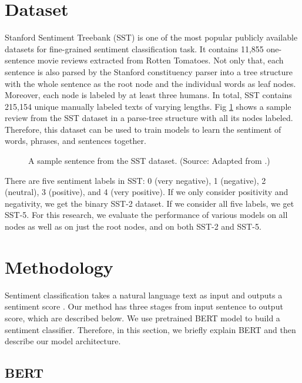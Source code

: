 \documentclass[conference]{IEEEtran}
\begin{document}
 \section{Dataset}\label{sec:data}

Stanford Sentiment Treebank (SST)\cite{rntn} is one of the most popular publicly available datasets for fine-grained sentiment classification task. It contains 11,855 one-sentence movie reviews extracted from Rotten Tomatoes. Not only that, each sentence is also parsed by the Stanford constituency parser\cite{stanford-parser} into a tree structure with the whole sentence as the root node and the individual words as leaf nodes. Moreover, each node is labeled by at least three humans. In total, SST contains 215,154 unique manually labeled texts of varying lengths. Fig \ref{fig:sst-sample} shows a sample review from the SST dataset in a parse-tree structure with all its nodes labeled. Therefore, this dataset can be used to train models to learn the sentiment of words, phrases, and sentences together.

\begin{figure}[ht]
    \centering
    \caption{A sample sentence from the SST dataset. (Source: Adapted from  \cite{rntn}.)}
    \label{fig:sst-sample}
\end{figure}

There are five sentiment labels in SST: 0 (very negative), 1 (negative), 2 (neutral), 3 (positive), and 4 (very positive). If we only consider positivity and negativity, we get the binary SST-2 dataset. If we consider all five labels, we get SST-5. For this research, we evaluate the performance of various models on all nodes as well as on just the root nodes, and on both SST-2 and SST-5. \section{Methodology}\label{sec:method}

Sentiment classification takes a natural language text as input and outputs a sentiment score . Our method has three stages from input sentence to output score, which are described below. We use pretrained BERT model to build a sentiment classifier. Therefore, in this section, we briefly explain BERT and then describe our model architecture.

\subsection{BERT}
\end{document}
